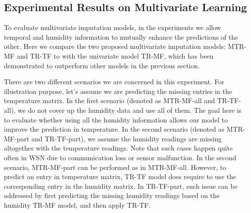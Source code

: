 \subsection{Experimental Results on Multivariate Learning}




To evaluate multivariate imputation models, in the experiments we allow temporal and humidity information to mutually enhance the predictions of the other. Here we compare the two proposed multivariate imputation models: MTR-MF and TR-TF to with the univariate model TR-MF, which has been demonstrated to outperform other models in the previous section. 

There are two different scenarios we are concerned in this experiment. For illustration purpose, let's assume we are predicting the missing entries in the temperature matrix. In the first scenario (denoted as MTR-MF-all and TR-TF-all), we do not cover up the humidity data and use all of them. The goal here is to evaluate whether using all the humidity information allows our model to improve the prediction in temperature. In the second scenario (denoted as MTR-MF-part and TR-TF-part), we assume the humidity readings are missing altogether with the temperature readings. Note that such cases happen quite often in WSN due to communication loss or sensor malfunction. In the second scenario, MTR-MF-part can be performed as in MTR-MF-all. However, to predict an entry in temperature matrix, TR-TF model does require to use the corresponding entry in the humidity matrix. In TR-TF-part, such issue can be addressed by first predicting the missing humidity readings based on the humidity TR-MF model, and then apply TR-TF.


